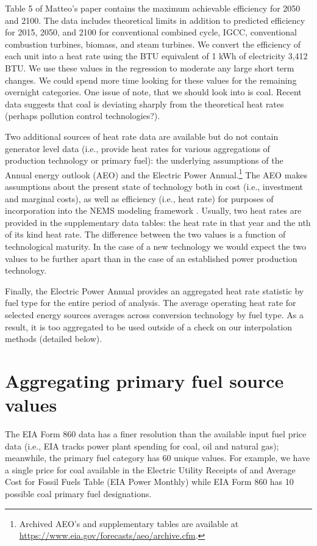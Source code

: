 \documentclass[10pt]{report}
\begin{document}
Table 5 of Matteo's paper \cite{} contains the maximum achievable efficiency for 2050 and 2100.
The data includes theoretical limits in addition to predicted efficiency for 2015, 2050, and 2100 for conventional combined cycle, IGCC, conventional combustion turbines, biomass, and steam turbines. 
We convert the efficiency of each unit into a heat rate using the BTU equivalent of 1 kWh of electricity 3,412 BTU.
We use these values in the regression to moderate any large short term changes.
We could spend more time looking for these values for the remaining overnight categories.
One issue of note, that we should look into is coal.
Recent data suggests that coal is deviating sharply from the theoretical heat rates (perhaps pollution control technologies?).

Two additional sources of heat rate data are available but do not contain generator level data (i.e., provide heat rates for various aggregations of production technology or primary fuel): the underlying assumptions of the Annual energy outlook (AEO) and the Electric Power Annual.\footnote{Archived AEO's and supplementary tables are available at  \url{https://www.eia.gov/forecasts/aeo/archive.cfm}.}
The AEO makes assumptions about the present state of technology both in cost (i.e., investment and marginal costs), as well as efficiency (i.e., heat rate) for purposes of incorporation into the NEMS modeling framework \parencite{eiaaeo2016}.
Usually, two heat rates are provided in the supplementary data tables: the heat rate in that year and the nth of its kind heat rate. 
The difference between the two values is a function of technological maturity.
In the case of a new technology we would expect the two values to be further apart than in the case of an established power production technology. 

Finally, the Electric Power Annual provides an aggregated heat rate statistic by fuel type for the entire period of analysis. 
The average operating heat rate for selected energy sources averages across conversion technology by fuel type.
As a result, it is too aggregated to be used outside of a check on our interpolation methods (detailed below). 

\section{Aggregating primary fuel source values}
The EIA Form 860 data has a finer resolution than the available input fuel price data (i.e., EIA tracks power plant spending for coal, oil and natural gas); meanwhile, the primary fuel category has 60 unique values.
For example, we have a single price for coal available in the Electric Utility Receipts of and Average Cost for Fossil Fuels Table \parencite{}(EIA Power Monthly) while EIA Form 860 has 10 possible coal primary fuel designations.   
\end{document}
